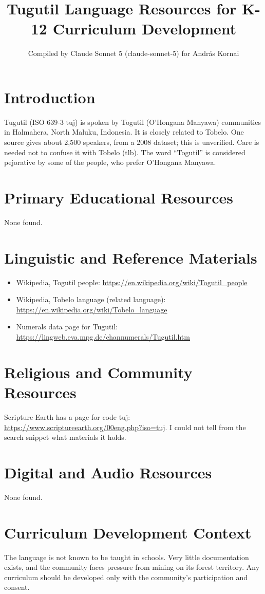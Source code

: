 \documentclass[12pt]{article}
\title{Tugutil Language Resources for K-12 Curriculum Development}
\author{Compiled by Claude Sonnet 5 (claude-sonnet-5) for Andr\'as Kornai}
\date{}
\begin{document}
\maketitle
\section{Introduction}
Tugutil (ISO 639-3 tuj) is spoken by Togutil (O'Hongana Manyawa) communities in Halmahera, North Maluku, Indonesia. It is closely related to Tobelo. One source gives about 2,500 speakers, from a 2008 dataset; this is unverified. Care is needed not to confuse it with Tobelo (tlb). The word ``Togutil'' is considered pejorative by some of the people, who prefer O'Hongana Manyawa.
\section{Primary Educational Resources}
None found.
\section{Linguistic and Reference Materials}
\begin{itemize}
\item Wikipedia, Togutil people: \url{https://en.wikipedia.org/wiki/Togutil_people}
\item Wikipedia, Tobelo language (related language): \url{https://en.wikipedia.org/wiki/Tobelo_language}
\item Numerals data page for Tugutil: \url{https://lingweb.eva.mpg.de/channumerals/Tugutil.htm}
\end{itemize}
\section{Religious and Community Resources}
Scripture Earth has a page for code tuj: \url{https://www.scriptureearth.org/00eng.php?iso=tuj}. I could not tell from the search snippet what materials it holds.
\section{Digital and Audio Resources}
None found.
\section{Curriculum Development Context}
The language is not known to be taught in schools. Very little documentation exists, and the community faces pressure from mining on its forest territory. Any curriculum should be developed only with the community's participation and consent.
\end{document}
